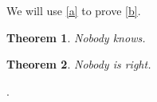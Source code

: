 \documentclass{article}
\newtheorem{theorem}{Theorem}
\begin{document}
We will use \autoref{a} to prove \autoref{b}.
\begin{theorem}\label{a}Nobody knows.\end{theorem}
\begin{theorem}\label{b}Nobody is right.\end{theorem}.
\end{document}
